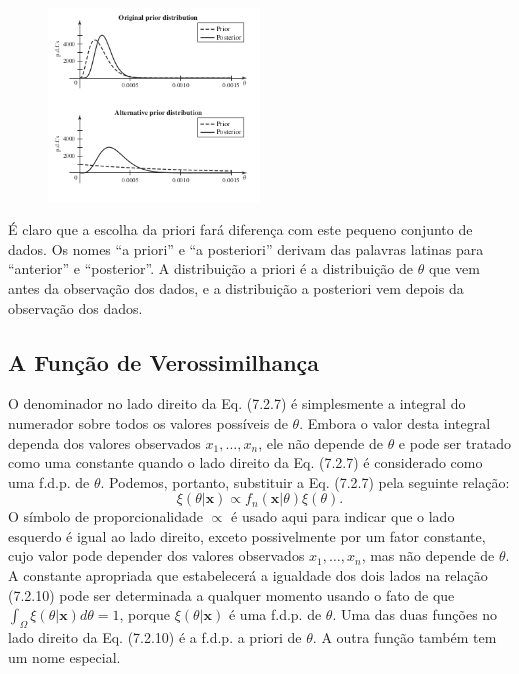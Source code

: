 \vspace{1cm}
\begin{figure}[H]

\centering

\includegraphics[width=0.5\textwidth]{img/7_2/img_1.png}

\end{figure}



\vspace{1cm}

É claro que a escolha da priori fará diferença com este pequeno conjunto de dados.
Os nomes ``a priori'' e ``a posteriori'' derivam das palavras latinas para ``anterior'' e ``posterior''. A distribuição a priori é a distribuição de $\theta$ que vem antes da observação dos dados, e a distribuição a posteriori vem depois da observação dos dados.

\subsection*{A Função de Verossimilhança}
O denominador no lado direito da Eq. (7.2.7) é simplesmente a integral do numerador sobre todos os valores possíveis de $\theta$. Embora o valor desta integral dependa dos valores observados $x_1, \dots, x_n$, ele não depende de $\theta$ e pode ser tratado como uma constante quando o lado direito da Eq. (7.2.7) é considerado como uma f.d.p. de $\theta$. Podemos, portanto, substituir a Eq. (7.2.7) pela seguinte relação:
\begin{equation}
\xi(\theta|\mathbf{x}) \propto f_n(\mathbf{x}|\theta)\xi(\theta). \tag{7.2.10}
\end{equation}
O símbolo de proporcionalidade $\propto$ é usado aqui para indicar que o lado esquerdo é igual ao lado direito, exceto possivelmente por um fator constante, cujo valor pode depender dos valores observados $x_1, \dots, x_n$, mas não depende de $\theta$. A constante apropriada que estabelecerá a igualdade dos dois lados na relação (7.2.10) pode ser determinada a qualquer momento usando o fato de que $\int_{\Omega} \xi(\theta|\mathbf{x})d\theta=1$, porque $\xi(\theta|\mathbf{x})$ é uma f.d.p. de $\theta$.
Uma das duas funções no lado direito da Eq. (7.2.10) é a f.d.p. a priori de $\theta$. A outra função também tem um nome especial.


